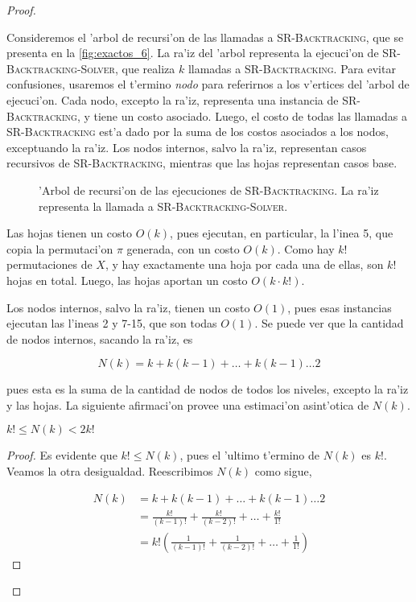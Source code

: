 \begin{theorem}
\begin{proof}
\begin{enumerate}
Consideremos el 'arbol de recursi'on de las llamadas a \textsc{SR-Backtracking}, que se presenta en la \autoref{fig:exactos_6}. La ra'iz del 'arbol representa la ejecuci'on de \textsc{SR-Backtracking-Solver}, que realiza $k$ llamadas a \textsc{SR-Backtracking}. Para evitar confusiones, usaremos el t'ermino \textit{nodo} para referirnos a los v'ertices del 'arbol de ejecuci'on. Cada nodo, excepto la ra'iz, representa una instancia de \textsc{SR-Backtracking}, y tiene un costo asociado. Luego, el costo de todas las llamadas a \textsc{SR-Backtracking} est'a dado por la suma de los costos asociados a los nodos, exceptuando la ra'iz. Los nodos internos, salvo la ra'iz, representan casos recursivos de \textsc{SR-Backtracking}, mientras que las hojas representan casos base.

\begin{figure}[h]
	\begin{center}
		
	\end{center}		
	\caption{'Arbol de recursi'on de las ejecuciones de \textsc{SR-Backtracking}. La ra'iz representa la llamada a \textsc{SR-Backtracking-Solver}.}
	\label{fig:exactos_6}
\end{figure}

Las hojas tienen un costo $O(k)$, pues ejecutan, en particular, la l'inea 5, que copia la permutaci'on $\pi$ generada, con un costo $O(k)$. Como hay $k!$ permutaciones de $X$, y hay exactamente una hoja por cada una de ellas, son $k!$ hojas en total. Luego, las hojas aportan un costo $O(k \cdot k!)$.

Los nodos internos, salvo la ra'iz, tienen un costo $O(1)$, pues esas instancias ejecutan las l'ineas 2 y 7-15, que son todas $O(1)$. Se puede ver que la cantidad de nodos internos, sacando la ra'iz, es

\[N(k) = k + k(k - 1) + \dots + k(k - 1)\dots 2\]

\noindent
pues esta es la suma de la cantidad de nodos de todos los niveles, excepto la ra'iz y las hojas. La siguiente afirmaci'on provee una estimaci'on asint'otica de $N(k)$.

\begin{claim}
$k! \leq N(k) < 2k!$

\begin{proof}
Es evidente que $k! \leq N(k)$, pues el 'ultimo t'ermino de $N(k)$ es $k!$. Veamos la otra desigualdad. Reescribimos $N(k)$ como sigue,

\begin{align*}
N(k) &= k + k(k - 1) + \dots + k(k - 1) \dots 2\\
&= \frac{k!}{(k - 1)!} + \frac{k!}{(k - 2)!} + \dots + \frac{k!}{1!}\\
&= k!\left(\frac{1}{(k - 1)!} + \frac{1}{(k - 2)!} + \dots + \frac{1}{1!}\right)
\end{align*}


\end{proof}
\end{claim}
\end{enumerate}
\end{proof}
\end{theorem}
